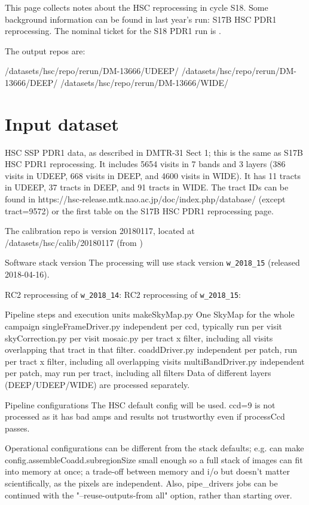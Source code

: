 
This page collects notes about the HSC reprocessing in cycle S18.  Some background information can be found in last year's run: S17B HSC PDR1 reprocessing. The nominal ticket for the S18 PDR1 run is .

The output repos are: 

/datasets/hsc/repo/rerun/DM-13666/UDEEP/
/datasets/hsc/repo/rerun/DM-13666/DEEP/
/datasets/hsc/repo/rerun/DM-13666/WIDE/

\section{Input dataset}

HSC SSP PDR1 data, as described in DMTR-31 Sect 1; this is the same as S17B HSC PDR1 reprocessing. It includes 5654 visits in 7 bands and 3 layers (386 visits in UDEEP, 668 visits in DEEP, and 4600 visits in WIDE). It has 11 tracts in UDEEP, 37 tracts in DEEP, and 91 tracts in WIDE. The tract IDs can be found in https://hsc-release.mtk.nao.ac.jp/doc/index.php/database/ (except tract=9572) or the first table on the S17B HSC PDR1 reprocessing page. 

The calibration repo is version 20180117, located at /datasets/hsc/calib/20180117  (from )


Software stack version
The processing will use stack version \texttt{w\_2018\_15} (released 2018-04-16). 

RC2 reprocessing of \texttt{w\_2018\_14}: 
RC2 reprocessing of \texttt{w\_2018\_15}: 


Pipeline steps and execution units
makeSkyMap.py    One SkyMap for the whole campaign
singleFrameDriver.py    independent per ccd, typically run per visit
skyCorrection.py    per visit
mosaic.py    per tract x filter, including all visits overlapping that tract in that filter.
coaddDriver.py  independent per patch, run per tract x filter, including all overlapping visits
multiBandDriver.py    independent per patch, may run per tract, including all filters
Data of different layers (DEEP/UDEEP/WIDE) are processed separately.


Pipeline configurations
The HSC default config will be used. ccd=9 is not processed as it has bad amps and results not trustworthy even if processCcd passes.  

Operational configurations can be different from the stack defaults; e.g. can make config.assembleCoadd.subregionSize small enough so a full stack of images can fit into memory at once; a trade-off between memory and i/o but doesn't matter scientifically, as the pixels are independent. Also, pipe\_drivers jobs can be continued with the "--reuse-outputs-from all" option, rather than starting over. 


